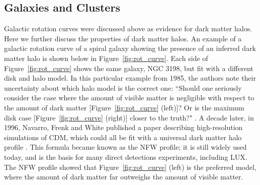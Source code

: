 \subsection{Galaxies and Clusters}
Galactic rotation curves were discussed above as evidence for dark matter halos. Here we further discuss the properties of dark matter halos. An example of a galactic rotation curve of a spiral galaxy showing the presence of an inferred dark matter halo is shown below in Figure~\ref{fig:rot_curve}. Each side of  Figure~\ref{fig:rot_curve} shows the same galaxy, NGC 3198, but fit with a different disk and halo model. In this particular example from 1985, the authors note their uncertainty about which halo model is the correct one: ``Should one seriously consider the case where the amount of visible matter is negligible with respect to the amount of dark matter [Figure~\ref{fig:rot_curve} (left)]? Or is the maximum disk case [Figure~\ref{fig:rot_curve} (right)] closer to the truth?" \cite{Albada1985}. A decade later, in 1996, Navarro, Frenk and White published a paper describing high-resolution simulations of \ac{CDM}, which could all be fit with a universal dark matter halo profile \cite{Navarro1996}. This formula became known as the \ac{NFW} profile; it is still widely used today, and is the basis for many direct detections experiments, including \ac{LUX}. The \ac{NFW} profile showed that Figure~\ref{fig:rot_curve} (left) is the preferred model, where the amount of dark matter far outweighs the amount of visible matter.

